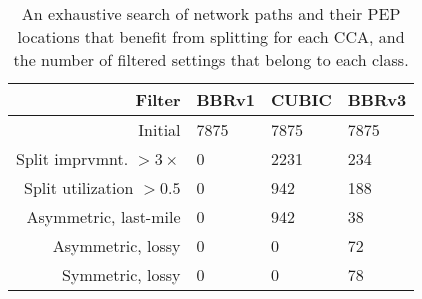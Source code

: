 \begin{table}[t!]
  \centering
\begin{tabular}{ r l l l }
  \toprule
    \textbf{Filter} & \textbf{BBRv1} & \textbf{CUBIC} & \textbf{BBRv3} \\
    \midrule
    Initial & 7875 & 7875 & 7875 \\
    Split imprvmnt. $>3\times$ & 0 & 2231 & 234 \\
    Split utilization $>0.5$ & 0 & 942 & 188 \\
    \midrule
    Asymmetric, last-mile & 0 & 942 & 38 \\
    Asymmetric, lossy & 0 & 0 & 72 \\
    Symmetric, lossy & 0 & 0 & 78 \\
    \bottomrule
\end{tabular}
  \caption{\label{tab:network-path-analysis} An exhaustive search of network
   paths and their PEP locations that benefit from splitting for each CCA, and
   the number of filtered settings that belong to each class.}
  \vspace{-0.4cm}
\end{table}
